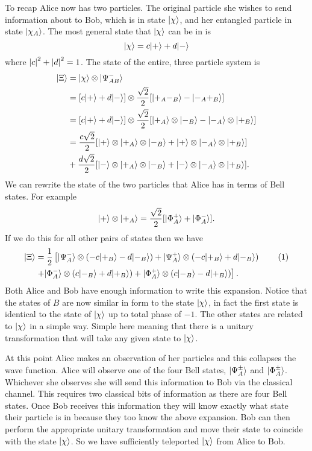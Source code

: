     To recap Alice now has two particles.
    The original particle she wishes to send information about to Bob, which is in state \(\vert {\chi} \rangle\), and her entangled particle in state \(\vert {\chi_A} \rangle\).
    The most general state that \(\vert {\chi} \rangle\) can be in is
    \[\vert {\chi} \rangle = c\vert {+} \rangle + d\vert {-} \rangle\]
    where \(\abs{c}^2 + \abs{d}^2 = 1\).
    The state of the entire, three particle system is
    \begin{align*}
        \vert {\Xi} \rangle &= \vert {\chi} \rangle \otimes \vert {\Psi^-_{AB}} \rangle\\
        &= [c\vert {+} \rangle + d\vert {-} \rangle] \otimes \frac{\sqrt{2}}{2}[\vert {+_A-_B} \rangle - \vert {-_A+_B} \rangle]\\
        &= [c\vert {+} \rangle + d\vert {-} \rangle] \otimes \frac{\sqrt{2}}{2}[\vert {+_A} \rangle\otimes\vert {-_B} \rangle - \vert {-_A} \rangle\otimes\vert {+_B} \rangle]\\
        &= \frac{c\sqrt{2}}{2}[\vert {+} \rangle\otimes\vert {+_A} \rangle\otimes\vert {-_B} \rangle + \vert {+} \rangle\otimes\vert {-_A} \rangle\otimes\vert {+_B} \rangle]\\
        &+ \frac{d\sqrt{2}}{2} [\vert {-} \rangle\otimes\vert {+_A} \rangle \otimes \vert {-_B} \rangle + \vert {-} \rangle\otimes\vert {-_A} \rangle\otimes\vert {+_B} \rangle].
    \end{align*}
    We can rewrite the state of the two particles that Alice has in terms of Bell states.
    For example
    \[\vert {+} \rangle\otimes\vert {+_A} \rangle = \frac{\sqrt{2}}{2}[\vert {\Phi^+_{A}} \rangle + \vert {\Phi^-_{A}} \rangle].\]
    If we do this for all other pairs of states then we have
    \begin{align*}
        \ket{\Xi} &= \frac{1}{2}\left[\ket{\Psi^-_{A}} \tensorProd (-c\ket{+_B} - d\ket{-_B}) + \ket{\Psi^+_A} \tensorProd (-c\ket{+_B} + d\ket{-_B}) \right.\stepcounter{equation}\tag{\theequation}\label{eqn:quantum teleportation state}\\
        &\left.+ \ket{\Phi^-_A} \tensorProd (c\ket{-_B} + d\ket{+_B}) + \ket{\Phi^+_A} \tensorProd (c\ket{-_B} - d\ket{+_B})\right].
    \end{align*}
    Both Alice and Bob have enough information to write this expansion.
    Notice that the states of \(B\) are now similar in form to the state \(\vert {\chi} \rangle\), in fact the first state is identical to the state of \(\vert {\chi} \rangle\) up to total phase of \(-1\).
    The other states are related to \(\vert {\chi} \rangle\) in a simple way.
    Simple here meaning that there is a unitary transformation that will take any given state to \(\vert {\chi} \rangle\).
    
    At this point Alice makes an observation of her particles and this collapses the wave function.
    Alice will observe one of the four Bell states, \(\vert {\Psi^{\pm}_A} \rangle\) and \(\vert {\Phi^{\pm}_A} \rangle\).
    Whichever she observes she will send this information to Bob via the classical channel.
    This requires two classical bits of information as there are four Bell states.
    Once Bob receives this information they will know exactly what state their particle is in because they too know the above expansion.
    Bob can then perform the appropriate unitary transformation and move their state to coincide with the state \(\vert {\chi} \rangle\).
    So we have sufficiently teleported \(\vert {\chi} \rangle\) from Alice to Bob.
    
